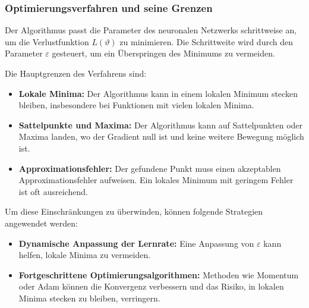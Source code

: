 \subsubsection{Optimierungsverfahren und seine Grenzen}\label{neuronal:subsubsection:optimierungsverfahren_grenzen}

Der Algorithmus passt die Parameter des neuronalen Netzwerks schrittweise an, um die Verlustfunktion \( L(\vartheta) \) zu minimieren. Die Schrittweite wird durch den Parameter \( \varepsilon \) gesteuert, um ein Überspringen des Minimums zu vermeiden.

Die Hauptgrenzen des Verfahrens sind:
\begin{itemize}
    \item \textbf{Lokale Minima:} Der Algorithmus kann in einem lokalen Minimum stecken bleiben, insbesondere bei Funktionen mit vielen lokalen Minima.
    \item \textbf{Sattelpunkte und Maxima:} Der Algorithmus kann auf Sattelpunkten oder Maxima landen, wo der Gradient null ist und keine weitere Bewegung möglich ist.
    \item \textbf{Approximationsfehler:} Der gefundene Punkt muss einen akzeptablen Approximationsfehler aufweisen. Ein lokales Minimum mit geringem Fehler ist oft ausreichend.
\end{itemize}

Um diese Einschränkungen zu überwinden, können folgende Strategien angewendet werden:
\begin{itemize}
    \item \textbf{Dynamische Anpassung der Lernrate:} Eine Anpassung von \( \varepsilon \) kann helfen, lokale Minima zu vermeiden.
    \item \textbf{Fortgeschrittene Optimierungsalgorithmen:} Methoden wie Momentum oder Adam können die Konvergenz verbessern und das Risiko, in lokalen Minima stecken zu bleiben, verringern.
\end{itemize}

